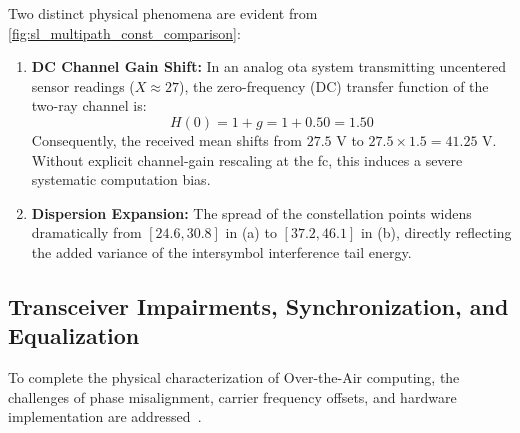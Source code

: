 \documentclass[Markos_Delaportas_1316.tex]{subfiles}
\begin{document}
Two distinct physical phenomena are evident from
\cref{fig:sl_multipath_const_comparison}:
\begin{enumerate}[leftmargin=*]
    \item \textbf{DC Channel Gain Shift:} In an analog \gls{ota}
        system transmitting uncentered sensor readings ($X \approx 27$),
        the zero-frequency (DC) transfer function of the two-ray channel is:
        \begin{equation}
            H(0) = 1 + g = 1 + 0.50 = 1.50
            \label{eq:channel_dc_gain}
        \end{equation}
        Consequently, the received mean shifts from $27.5\text{ V}$
        to $27.5 \times 1.5 = 41.25\text{ V}$. Without explicit channel-gain
        rescaling at the \gls{fc}, this induces a severe systematic
        computation bias.
    \item \textbf{Dispersion Expansion:} The spread of the
        constellation points widens dramatically from $[24.6, 30.8]$ in (a)
        to $[37.2, 46.1]$ in (b), directly reflecting the added
        variance of the intersymbol interference tail energy.
\end{enumerate}

\subsection{Transceiver Impairments, Synchronization, and Equalization}
\label{subsec:impairments_and_equalization}
To complete the physical characterization of Over-the-Air computing,
the challenges of phase misalignment, carrier frequency
offsets, and hardware implementation are
addressed~\cite{sahin_survey_2023,evgenidis_waveform_2025,xiao_heterogeneous_2025}.
\end{document}

